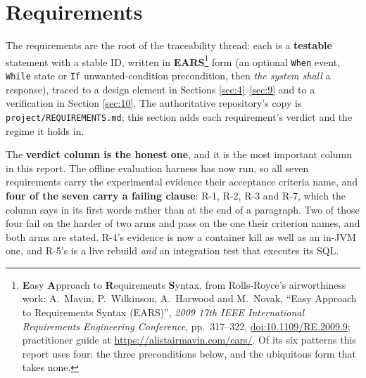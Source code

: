 \section{Requirements}\label{sec:3}

The requirements are the root of the traceability thread: each is a \textbf{testable} statement
with a stable ID, written in \textbf{EARS}\footnote{\textbf{E}asy \textbf{A}pproach to \textbf{R}equirements
\textbf{S}yntax, from Rolls-Royce's airworthiness work: A.~Mavin, P.~Wilkinson, A.~Harwood and
M.~Novak, ``Easy Approach to Requirements Syntax (EARS)'', \emph{2009 17th IEEE International
Requirements Engineering Conference}, pp.~317--322,
\href{https://doi.org/10.1109/RE.2009.9}{doi:10.1109/RE.2009.9}; practitioner guide at
\url{https://alistairmavin.com/ears/}. Of its six patterns this report uses four: the three
preconditions below, and the ubiquitous form that takes none.} form (an optional \texttt{When} event, \texttt{While}
state or \texttt{If} unwanted-condition precondition, then \emph{the system shall} a response),
traced to a design element in Sections \ref{sec:4}–\ref{sec:9} and to a verification in Section \ref{sec:10}. The authoritative
repository's copy is \texttt{project/REQUIREMENTS.md}; this section adds each
requirement's verdict and the regime it holds in.

The \textbf{verdict column is the honest one}, and it is the most important column in this report.
The offline evaluation harness has now run, so all seven requirements carry the experimental
evidence their acceptance criteria name, and \textbf{four of the seven carry a failing clause}:
R-1, R-2, R-3 and R-7, which the column says in its first words rather than at the end of a
paragraph. Two of those four fail on the harder of two arms and pass on the one their criterion
names, and both arms are stated. R-4's evidence is now a container kill as well as an in-JVM one,
and R-5's is a live rebuild \emph{and} an integration test that executes its SQL.

